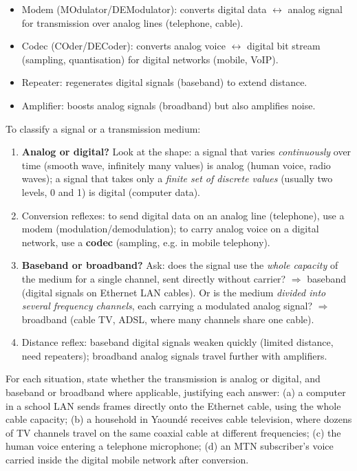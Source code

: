 \documentclass[11pt]{article}
\newcommand{\cle}[1]{{\popxbold\color{popdark}#1}}
\begin{document}
\begin{propriete}
\begin{itemize}
\item \cle{Modem} (MOdulator/DEModulator): converts digital data $\leftrightarrow$ analog signal for transmission over analog lines (telephone, cable).
\item \cle{Codec} (COder/DECoder): converts analog voice $\leftrightarrow$ digital bit stream (sampling, quantisation) for digital networks (mobile, VoIP).
\item \cle{Repeater}: regenerates digital signals (baseband) to extend distance.
\item \cle{Amplifier}: boosts analog signals (broadband) but also amplifies noise.
\end{itemize}
\end{propriete}

\begin{methode}
To classify a signal or a transmission medium:
\begin{enumerate}
\item \textbf{Analog or digital?} Look at the shape: a signal that varies \emph{continuously} over time (smooth wave, infinitely many values) is \cle{analog} (human voice, radio waves); a signal that takes only a \emph{finite set of discrete values} (usually two levels, 0 and 1) is \cle{digital} (computer data).
\item Conversion reflexes: to send digital data on an analog line (telephone), use a \cle{modem} (modulation/demodulation); to carry analog voice on a digital network, use a \textbf{codec} (sampling, e.g. in mobile telephony).
\item \textbf{Baseband or broadband?} Ask: does the signal use the \emph{whole capacity} of the medium for a single channel, sent directly without carrier? $\Rightarrow$ \cle{baseband} (digital signals on Ethernet LAN cables). Or is the medium \emph{divided into several frequency channels}, each carrying a modulated analog signal? $\Rightarrow$ \cle{broadband} (cable TV, ADSL, where many channels share one cable).
\item Distance reflex: baseband digital signals weaken quickly (limited distance, need repeaters); broadband analog signals travel further with amplifiers.
\end{enumerate}
\end{methode}

\begin{experience}
For each situation, state whether the transmission is analog or digital, and baseband or broadband where applicable, justifying each answer: (a) a computer in a school LAN sends frames directly onto the Ethernet cable, using the whole cable capacity; (b) a household in Yaound\'e receives cable television, where dozens of TV channels travel on the same coaxial cable at different frequencies; (c) the human voice entering a telephone microphone; (d) an MTN subscriber's voice carried inside the digital mobile network after conversion.
\end{experience}
\end{document}

